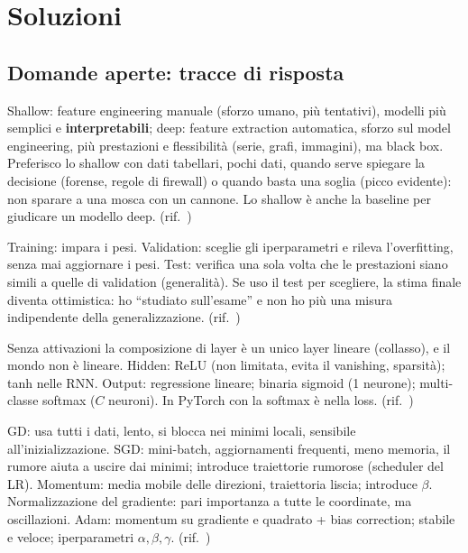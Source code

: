 

\section{Soluzioni}
\label{sec:esercizi-soluzioni}

\subsection*{Domande aperte: tracce di risposta}

\begin{soluzione}
Shallow: feature engineering manuale (sforzo umano, più tentativi), modelli più semplici e
        \textbf{interpretabili}; deep: feature extraction automatica, sforzo sul model engineering, più prestazioni e flessibilità
        (serie, grafi, immagini), ma black box. Preferisco lo shallow con dati tabellari, pochi dati, quando serve spiegare la decisione
        (forense, regole di firewall) o quando basta una soglia (picco evidente): non sparare a una mosca con un cannone. Lo shallow è
        anche la baseline per giudicare un modello deep.
(rif.\ )
\end{soluzione}

\begin{soluzione}
Training: impara i pesi. Validation: sceglie gli iperparametri e rileva l'overfitting, senza mai
        aggiornare i pesi. Test: verifica una sola volta che le prestazioni siano simili a quelle di validation (generalità). Se uso il test per
        scegliere, la stima finale diventa ottimistica: ho ``studiato sull'esame'' e non ho più una misura indipendente della generalizzazione.
(rif.\ )
\end{soluzione}

\begin{soluzione}
Senza attivazioni la composizione di layer è un unico layer lineare (collasso), e il mondo non è lineare.
        Hidden: ReLU (non limitata, evita il vanishing, sparsità); tanh nelle RNN. Output: regressione lineare; binaria sigmoid (1 neurone);
        multi-classe softmax ($C$ neuroni). In PyTorch con  la softmax è nella loss.
(rif.\ )
\end{soluzione}

\begin{soluzione}[A4 -- Ottimizzatori]
GD: usa tutti i dati, lento, si blocca nei minimi locali, sensibile all'inizializzazione. SGD: mini-batch,
        aggiornamenti frequenti, meno memoria, il rumore aiuta a uscire dai minimi; introduce traiettorie rumorose (scheduler del LR).
        Momentum: media mobile delle direzioni, traiettoria liscia; introduce $\beta$. Normalizzazione del gradiente: pari importanza a tutte
        le coordinate, ma oscillazioni. Adam: momentum su gradiente e quadrato + bias correction; stabile e veloce; iperparametri
        $\alpha,\beta,\gamma$.
(rif.\ )
\end{soluzione}

